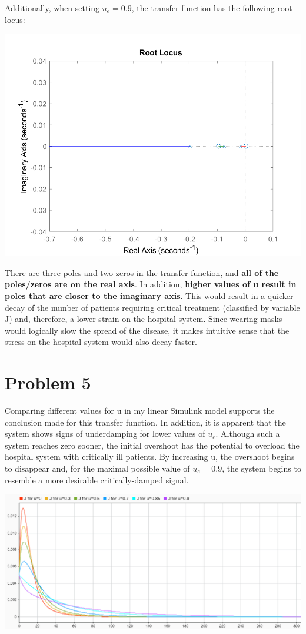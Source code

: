\documentclass[fleqn]{article}
\begin{document}
Additionally, when setting $u_e = 0.9$, the transfer function has the following root locus:
\begin{center}
    \includegraphics[width=0.7\linewidth]{tf_root_locus_u_0_9}
\end{center}

There are three poles and two zeros in the transfer function, and \textbf{all of the poles/zeros are on the real axis}. In addition, \textbf{higher values of u result in poles that are closer to the imaginary axis}. This would result in a quicker decay of the number of patients requiring critical treatment (classified by variable J) and, therefore, a lower strain on the hospital system. Since wearing masks would logically slow the spread of the disease, it makes intuitive sense that the stress on the hospital system would also decay faster.

\newpage

\section*{Problem 5}
Comparing different values for u in my linear Simulink model supports the conclusion made for this transfer function. In addition, it is apparent that the system shows signs of underdamping for lower values of $u_e$. Although such a system reaches zero sooner, the initial overshoot has the potential to overload the hospital system with critically ill patients. By increasing u, the overshoot begins to disappear and, for the maximal possible value of $u_e = 0.9$, the system begins to resemble a more desirable critically-damped signal.

\begin{center}
    \includegraphics[width=\linewidth]{J_simulink_u_values}
\end{center}
\end{document}
